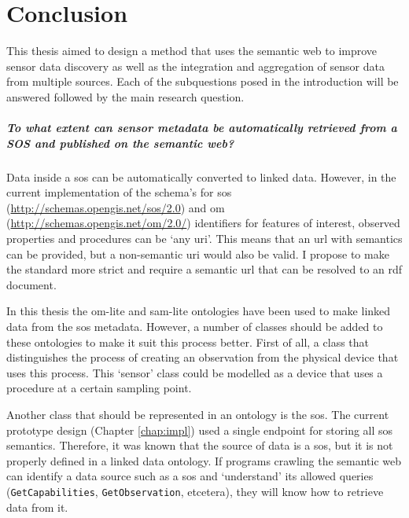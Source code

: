 
\chapter{Conclusion}
\label{chap:conclusion}

This thesis aimed to design a method that uses the semantic web to improve sensor data discovery as well as the integration and aggregation of sensor data from multiple sources. Each of the subquestions posed in the introduction will be answered followed by the main research question.

\paragraph{To what extent can sensor metadata be automatically retrieved from a SOS and published
	on the semantic web?}\mbox{}

Data inside a \acl{sos} can be automatically converted to linked data. However, in the current implementation of the schema's for \ac{sos} (\url{http://schemas.opengis.net/sos/2.0}) and \ac{om} (\url{http://schemas.opengis.net/om/2.0/}) identifiers for features of interest, observed properties and procedures can be `any \ac{uri}'. This means that an \ac{url} with semantics can be provided, but a non-semantic \ac{uri} would also be valid. I propose to make the standard more strict and require a semantic \ac{url} that can be resolved to an \ac{rdf} document.

In this thesis the om-lite and sam-lite ontologies have been used to make linked data from the \ac{sos} metadata. However, a number of classes should be added to these ontologies to make it suit this process better. First of all, a class that distinguishes the process of creating an observation from the physical device that uses this process. This `sensor' class could be modelled as a device that uses a procedure at a certain sampling point.

Another class that should be represented in an ontology is the \acl{sos}. The current prototype design (Chapter \ref{chap:impl}) used a single endpoint for storing all \ac{sos} semantics. Therefore, it was known that the source of data is a \ac{sos}, but it is not properly defined in a linked data ontology. If programs crawling the semantic web can identify a data source such as a \ac{sos} and `understand' its allowed queries (\texttt{GetCapabilities}, \texttt{GetObservation}, etcetera), they will know how to retrieve data from it.  

